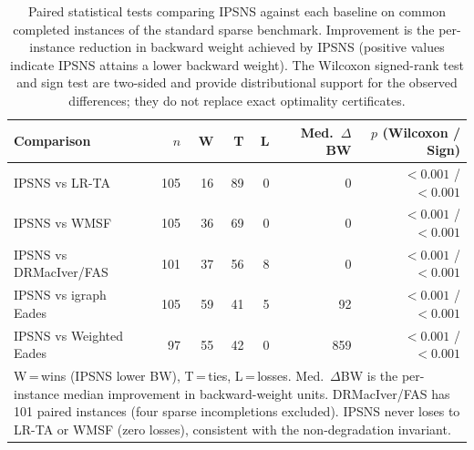 \begin{table}[htbp]
\centering
\footnotesize
\caption{Paired statistical tests comparing IPSNS against each baseline on
common completed instances of the standard sparse benchmark.
Improvement is the per-instance reduction in backward weight achieved by IPSNS
(positive values indicate IPSNS attains a lower backward weight).
The Wilcoxon signed-rank test and sign test are two-sided and
provide distributional support for the observed differences;
they do not replace exact optimality certificates.}
\label{tab:paired_sparse_tests}
\begin{tabular}{lrrrrrr}
\toprule
Comparison & $n$ & W & T & L & Med.\ $\Delta$BW & $p$ (Wilcoxon / Sign) \\
\midrule
IPSNS vs LR-TA          & 105 & 16 & 89 &  0 & 0   & ${<}0.001$ / ${<}0.001$ \\
IPSNS vs WMSF           & 105 & 36 & 69 &  0 & 0   & ${<}0.001$ / ${<}0.001$ \\
IPSNS vs DRMacIver/FAS  & 101 & 37 & 56 &  8 & 0   & ${<}0.001$ / ${<}0.001$ \\
IPSNS vs igraph Eades   & 105 & 59 & 41 &  5 & 92  & ${<}0.001$ / ${<}0.001$ \\
IPSNS vs Weighted Eades &  97 & 55 & 42 &  0 & 859 & ${<}0.001$ / ${<}0.001$ \\
\bottomrule
\multicolumn{7}{p{0.95\linewidth}}{\footnotesize
W\,=\,wins (IPSNS lower BW), T\,=\,ties, L\,=\,losses.
Med.\ $\Delta$BW is the per-instance median improvement in backward-weight units.
DRMacIver/FAS has 101 paired instances (four sparse incompletions excluded).
IPSNS never loses to LR-TA or WMSF (zero losses), consistent with the non-degradation invariant.} \\
\end{tabular}
\end{table}
